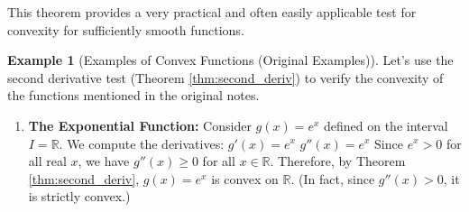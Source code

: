 \documentclass[11pt]{article}
\theoremstyle{definition}
\newtheorem{example}[theorem]{Example}
\theoremstyle{remark}
\begin{document}
This theorem provides a very practical and often easily applicable test for convexity for sufficiently smooth functions.

\begin{example}[Examples of Convex Functions (Original Examples)] \label{ex:original_convex}
Let's use the second derivative test (Theorem \ref{thm:second_deriv}) to verify the convexity of the functions mentioned in the original notes.
\begin{enumerate}
    \item \textbf{The Exponential Function:} Consider $g(x) = e^x$ defined on the interval $I = \mathbb{R}$.
        We compute the derivatives:
        $g'(x) = e^x$
        $g''(x) = e^x$
        Since $e^x > 0$ for all real $x$, we have $g''(x) \ge 0$ for all $x \in \mathbb{R}$. Therefore, by Theorem \ref{thm:second_deriv}, $g(x) = e^x$ is convex on $\mathbb{R}$. (In fact, since $g''(x) > 0$, it is strictly convex.)


\end{enumerate}
\end{example}
\end{document}
